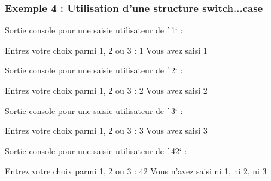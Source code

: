 \documentclass[10pt]{article}
\begin{document}
\subsubsection{Exemple 4 : Utilisation d'une structure switch...case}


\bigskip
Sortie console pour une saisie utilisateur de \texttt`1` :

\begin{textcode}
    Entrez votre choix parmi 1, 2 ou 3 : 1
    Vous avez saisi 1
\end{textcode}

Sortie console pour une saisie utilisateur de \texttt`2` :

\begin{textcode}
    Entrez votre choix parmi 1, 2 ou 3 : 2
    Vous avez saisi 2
\end{textcode}

Sortie console pour une saisie utilisateur de \texttt`3` :

\begin{textcode}
    Entrez votre choix parmi 1, 2 ou 3 : 3
    Vous avez saisi 3
\end{textcode}

Sortie console pour une saisie utilisateur de \texttt`42` :

\begin{textcode}
    Entrez votre choix parmi 1, 2 ou 3 : 42
    Vous n'avez saisi ni 1, ni 2, ni 3
\end{textcode}
\end{document}
